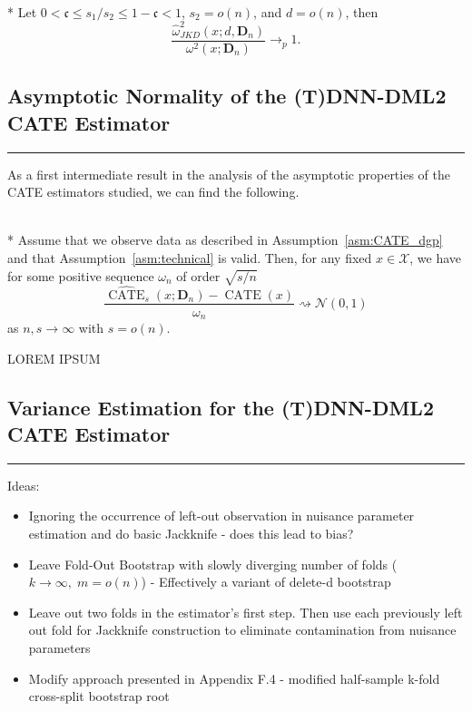 \begin{boxD}
	\begin{thm}\label{thm:JKD_Cons}\mbox{}\\*
		Let $0 < \mathfrak{c} \leq s_1/s_2 \leq 1 - \mathfrak{c} < 1$, $s_2 = o(n)$, and $d = o(n)$, then
		\begin{equation}
			\frac{\hat{\omega}_{JKD}^2\left(x; d, \mathbf{D}_n\right)}{\omega^{2}\left(x; \mathbf{D}_n\right)} \longrightarrow_{p} 1.
		\end{equation}
	\end{thm}
\end{boxD}

\newpage
\subsection{Asymptotic Normality of the (T)DNN-DML2 CATE Estimator}\label{CATE_AsympNorm}
\hrule

As a first intermediate result in the analysis of the asymptotic properties of the CATE estimators studied, we can find the following.
\begin{boxD}
	\begin{thm}\label{thm:DNNDML2_anorm_0}\mbox{}\\*
		Assume that we observe data as described in Assumption~\ref{asm:CATE_dgp} and that Assumption~\ref{asm:technical} is valid.
		Then, for any fixed $x \in \mathcal{X}$, we have for some positive sequence $\omega_n$ of order $\sqrt{s/n}$
		\begin{equation}
			\frac{\hat{\operatorname{CATE}}_{s}(x; \mathbf{D}_n) - \operatorname{CATE}(x)}{\omega_n}
			\rightsquigarrow \mathcal{N}\left(0,1\right)
		\end{equation}
		as $n,s \rightarrow \infty$ with $s = o(n)$.
	\end{thm}
\end{boxD}

{\color{red} LOREM IPSUM}

\subsection{Variance Estimation for the (T)DNN-DML2 CATE Estimator}\label{CATE_Var_Ests}
\hrule

{\color{red}
Ideas:
\begin{itemize}
	\item Ignoring the occurrence of left-out observation in nuisance parameter estimation and do basic Jackknife - does this lead to bias?
	\item Leave Fold-Out Bootstrap with slowly diverging number of folds ($k \rightarrow \infty, \;m = o(n)$) - Effectively a variant of delete-d bootstrap
	\item Leave out two folds in the estimator's first step. 
	Then use each previously left out fold for Jackknife construction to eliminate contamination from nuisance parameters
	\item Modify approach presented in \citet{ritzwoller_uniform_2024} Appendix F.4 - modified half-sample k-fold cross-split bootstrap root
\end{itemize}
}

